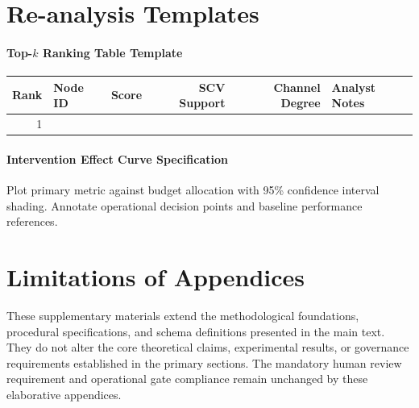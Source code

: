 \documentclass[12pt]{article}
\theoremstyle{plain}
\begin{document}
\section{Re-analysis Templates}
\label{app:templates}
\paragraph{Top-$k$ Ranking Table Template}
\begin{center}
\small
\begin{tabular}{r l r r r p{4cm}}
\toprule
\textbf{Rank} & \textbf{Node ID} & \textbf{Score} & \textbf{SCV Support} & \textbf{Channel Degree} & \textbf{Analyst Notes} \\
\midrule
1 & \phantom{Node\_A} & \phantom{0.000} & \phantom{3} & \phantom{25} & \phantom{Requires corroboration} \\
\bottomrule
\end{tabular}
\end{center}
\paragraph{Intervention Effect Curve Specification}
Plot primary metric against budget allocation with 95\% confidence interval shading. Annotate operational decision points and baseline performance references.

\section{Limitations of Appendices}
These supplementary materials extend the methodological foundations, procedural specifications, and schema definitions presented in the main text. They do not alter the core theoretical claims, experimental results, or governance requirements established in the primary sections. The mandatory human review requirement and operational gate compliance remain unchanged by these elaborative appendices.
\end{document}
